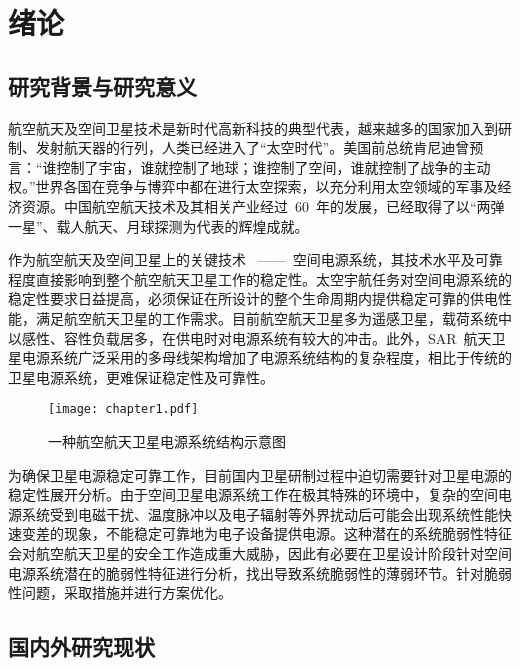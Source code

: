 \chapter{绪论}
\label{cha:intro}

\section{研究背景与研究意义}
\label{sec:chap1:backgroud}
航空航天及空间卫星技术是新时代高新科技的典型代表，越来越多的国家加入到研制、发射航天器的行列，人类已经进入了“太空时代”。美国前总统肯尼迪曾预言：“谁控制了宇宙，谁就控制了地球；谁控制了空间，谁就控制了战争的主动权。”世界各国在竞争与博弈中都在进行太空探索，以充分利用太空领域的军事及经济资源。中国航空航天技术及其相关产业经过~60~年的发展，已经取得了以“两弹一星”、载人航天、月球探测为代表的辉煌成就。

作为航空航天及空间卫星上的关键技术~\raisebox{0.5mm} {------}~空间电源系统，其技术水平及可靠程度直接影响到整个航空航天卫星工作的稳定性。太空宇航任务对空间电源系统的稳定性要求日益提高，必须保证在所设计的整个生命周期内提供稳定可靠的供电性能，满足航空航天卫星的工作需求。目前航空航天卫星多为遥感卫星，载荷系统中以感性、容性负载居多，在供电时对电源系统有较大的冲击。此外，SAR~航天卫星电源系统广泛采用的多母线架构增加了电源系统结构的复杂程度，相比于传统的卫星电源系统，更难保证稳定性及可靠性。
\begin{figure}[h]
  \centering
     \texttt{[image: chapter1.pdf]}\\
   \caption{一种航空航天卫星电源系统结构示意图}\label{fig:chap1:background}
\end{figure}

为确保卫星电源稳定可靠工作，目前国内卫星研制过程中迫切需要针对卫星电源的稳定性展开分析。由于空间卫星电源系统工作在极其特殊的环境中，复杂的空间电源系统受到电磁干扰、温度脉冲以及电子辐射等外界扰动后可能会出现系统性能快速变差的现象，不能稳定可靠地为电子设备提供电源。这种潜在的系统脆弱性特征会对航空航天卫星的安全工作造成重大威胁，因此有必要在卫星设计阶段针对空间电源系统潜在的脆弱性特征进行分析，找出导致系统脆弱性的薄弱环节。针对脆弱性问题，采取措施并进行方案优化。
\section{国内外研究现状}
\label{sec:chap1:situation}
